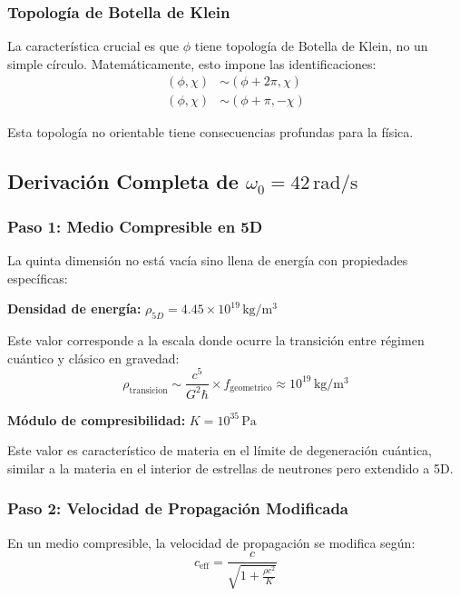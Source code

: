 \documentclass[12pt,a4paper]{article}
\begin{document}
\subsubsection{Topología de Botella de Klein}

La característica crucial es que $\phi$ tiene topología de Botella de Klein, no un simple círculo. Matemáticamente, esto impone las identificaciones:
\begin{align}
(\phi, \chi) &\sim (\phi + 2\pi, \chi) \\
(\phi, \chi) &\sim (\phi + \pi, -\chi)
\end{align}

Esta topología no orientable tiene consecuencias profundas para la física.

\subsection{Derivación Completa de $\omega_0 = 42\,\mathrm{rad/s}$}
\label{sec:derivacion_omega}

\subsubsection{Paso 1: Medio Compresible en 5D}

La quinta dimensión no está vacía sino llena de energía con propiedades específicas:

\textbf{Densidad de energía:} $\rho_{5D} = 4.45 \times 10^{19}\,\mathrm{kg/m^3}$

Este valor corresponde a la escala donde ocurre la transición entre régimen cuántico y clásico en gravedad:
\begin{equation}
\rho_\mathrm{transicion} \sim \frac{c^5}{G^2 \hbar} \times f_\mathrm{geometrico} \approx 10^{19}\,\mathrm{kg/m^3}
\end{equation}

\textbf{Módulo de compresibilidad:} $K = 10^{35}\,\mathrm{Pa}$

Este valor es característico de materia en el límite de degeneración cuántica, similar a la materia en el interior de estrellas de neutrones pero extendido a 5D.

\subsubsection{Paso 2: Velocidad de Propagación Modificada}

En un medio compresible, la velocidad de propagación se modifica según:
\begin{equation}
c_\mathrm{eff} = \frac{c}{\sqrt{1 + \frac{\rho c^2}{K}}}
\end{equation}
\end{document}
